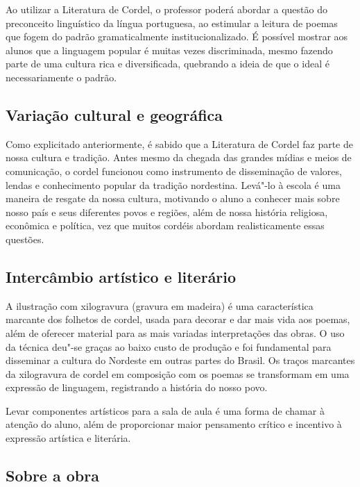 \documentclass[12pt]{extarticle}
\begin{document}
{Ao utilizar a Literatura de Cordel, o professor poderá abordar a questão
do preconceito linguístico da língua portuguesa, ao estimular a leitura
de poemas que fogem do padrão gramaticalmente institucionalizado. É
possível mostrar aos alunos que a linguagem popular é muitas vezes
discriminada, mesmo fazendo parte de uma cultura rica e diversificada,
quebrando a ideia de que o ideal é necessariamente o padrão.

\subsection{Variação cultural e geográfica}

Como explicitado anteriormente, é sabido que a Literatura de Cordel faz
parte de nossa cultura e tradição. Antes mesmo da chegada das grandes
mídias e meios de comunicação, o cordel funcionou como instrumento de
disseminação de valores, lendas e conhecimento popular da tradição
nordestina. Levá"-lo à escola é uma maneira de resgate da nossa cultura,
motivando o aluno a conhecer mais sobre nosso país e seus diferentes
povos e regiões, além de nossa história religiosa, econômica e política,
vez que muitos cordéis abordam realisticamente essas questões.

\subsection{Intercâmbio artístico e literário}

A ilustração com xilogravura (gravura em madeira) é uma característica
marcante dos folhetos de cordel, usada para decorar e dar mais vida aos
poemas, além de oferecer material para as mais variadas interpretações
das obras. O uso da técnica deu"-se graças ao baixo custo de produção e
foi fundamental para disseminar a cultura do Nordeste em outras partes
do Brasil. Os traços marcantes da xilogravura de cordel em composição
com os poemas se transformam em uma expressão de linguagem, registrando
a história do nosso povo.

Levar componentes artísticos para a sala de aula é uma forma de chamar à
atenção do aluno, além de proporcionar maior pensamento crítico e
incentivo à expressão artística e literária.


\subsection{Sobre a obra}

}
\end{document}
